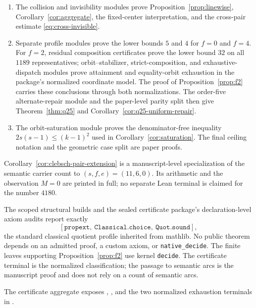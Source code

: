 \documentclass[11pt]{article}
\theoremstyle{definition}
\theoremstyle{remark}
\begin{document}
\begin{enumerate}[leftmargin=2.2em]
      maximum $W(k)=\lfloor(k-1)^2/4\rfloor$, derive the empty-carrier range
      from the phase inequality itself, and prove
      Theorem~\ref{thm:parameterized-repair} for semantic legal-pair finsets.
\item The collision and invisibility modules prove
      Proposition~\ref{prop:linewise}, Corollary~\ref{cor:aggregate}, the
      fixed-center interpretation, and the cross-pair estimate
      \eqref{eq:cross-invisible}.
\item Separate profile modules prove the lower bounds $5$ and $4$ for
      $f=0$ and $f=4$.  For $f=2$, residual composition certificates prove
      the lower bound $32$ on all $1189$ representatives; orbit--stabilizer,
      strict-composition, and exhaustive-dispatch modules prove attainment
      and equality-orbit exhaustion in the package's normalized coordinate
      model.  The proof of Proposition~\ref{prop:f2} carries these conclusions
      through both normalizations.  The order-five
      alternate-repair module and the paper-level parity split then give
      Theorem~\ref{thm:q25} and
      Corollary~\ref{cor:q25-uniform-repair}.
\item The orbit-saturation module proves the denominator-free inequality
      $2s(s-1)\le(k-1)^2$ used in Corollary~\ref{cor:saturation}.  The final
      ceiling notation and the geometric case split are paper proofs.
\end{enumerate}

Corollary~\ref{cor:clebsch-pair-extension} is a manuscript-level
specialization of the semantic carrier count to $(s,f,e)=(11,6,0)$.  Its
arithmetic and the observation $M=0$ are printed in full; no separate Lean
terminal is claimed for the number $4180$.

The scoped structural builds and the sealed certificate package's
declaration-level axiom audits report exactly
\[
  [\texttt{propext},\ \texttt{Classical.choice},\ \texttt{Quot.sound}],
\]
the standard classical quotient profile inherited from mathlib.  No public
theorem depends on an admitted proof, a custom axiom, or
\texttt{native\_decide}.  The finite leaves supporting
Proposition~\ref{prop:f2} use kernel \texttt{decide}.  The certificate terminal
is the normalized classification; the passage to semantic arcs is the
manuscript proof and does not rely on a count of semantic arcs.

The certificate aggregate exposes
,
, and the two normalized
exhaustion terminals in .
\end{document}
